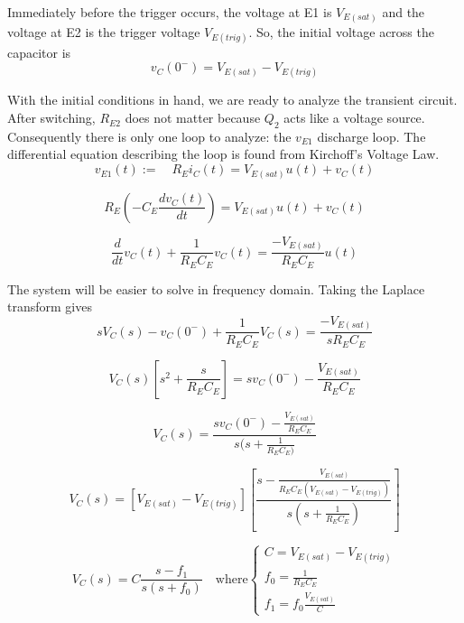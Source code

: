 \documentclass[titlepage, letterpaper, 10.5pt]{article}
\begin{document}
Immediately before the trigger occurs, the voltage at E1 is $V_{E(sat)}$ and
the voltage at E2 is the trigger voltage $V_{E(trig)}$.
So, the initial voltage across the capacitor is
\begin{equation}
v_{C}(0^{-})=V_{E(sat)}-V_{E(trig)}
\end{equation}

With the initial conditions in hand, we are ready to analyze the transient circuit.
After switching, $R_{E2}$ does not matter because $Q_{2}$ acts like a voltage source.
Consequently there is only one loop to analyze: the $v_{E1}$ discharge loop.
The differential equation describing the loop is found from Kirchoff's Voltage Law.
\begin{equation}
v_{E1}(t):=\quad R_{E}i_{C}(t)=V_{E(sat)}u(t)+v_{C}(t)
\label{ve1-kvl}
\end{equation}

\begin{equation*}
R_{E}\left(-C_{E}\frac{dv_{C}(t)}{dt}\right)=V_{E(sat)}u(t)+v_{C}(t)
\end{equation*}

\begin{equation}
\frac{d}{dt}v_{C}(t)+\frac{1}{R_{E}C_{E}}v_{C}(t)=\frac{-V_{E(sat)}}{R_{E}C_{E}}u(t)
\end{equation}

The system will be easier to solve in frequency domain. Taking the Laplace transform gives
\begin{equation*}
sV_{C}(s)-v_{C}(0^{-})+\frac{1}{R_{E}C_{E}}V_{C}(s)=\frac{-V_{E(sat)}}{sR_{E}C_{E}}
\end{equation*}

\begin{equation*}
V_{C}(s)\left[s^{2}+\frac{s}{R_{E}C_{E}}\right]=
sv_{C}(0^{-})-\frac{V_{E(sat)}}{R_{E}C_{E}}
\end{equation*}

\begin{equation*}
V_{C}(s)=\frac{sv_{C}(0^{-})-\frac{V_{E(sat)}}{R_{E}C_{E}}}
{s(s+\frac{1}{R_{E}C_{E})}}
\end{equation*}

\begin{equation*}
V_{C}(s)=[V_{E(sat)}-V_{E(trig)}]\left[
\frac{s-\frac{V_{E(sat)}}{R_{E}C_{E}(V_{E(sat)}-V_{E(trig)})}}
{s(s+\frac{1}{R_{E}C_{E}})}\right]
\end{equation*}

\begin{equation}
V_{C}(s)=C\frac{s-f_{1}}{s(s+f_{0})}\quad\textrm{where}
	\left\{
	\begin{array}{lr}
	C=V_{E(sat)}-V_{E(trig)}	\\
	f_{0}=\frac{1}{R_{E}C_{E}}	\\
	f_{1}=f_{0}\frac{V_{E(sat)}}{C}
	\end{array}
	\right.
\label{transfer-parameters}
\end{equation}
\end{document}
